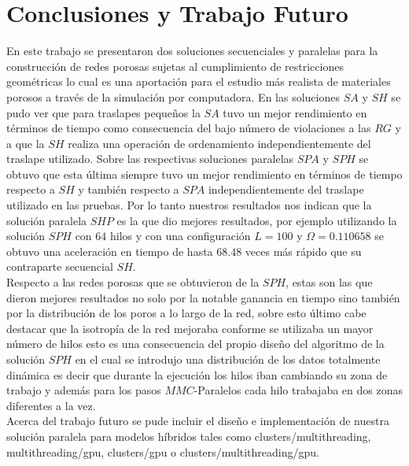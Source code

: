 \chapter{Conclusiones y Trabajo Futuro}
\label{champ:conclusions}
\bigskip
\barra
\bigskip

En este trabajo se presentaron dos soluciones secuenciales y paralelas para la construcción de redes porosas sujetas al cumplimiento de restricciones geométricas lo cual es una aportación para el estudio más realista de materiales porosos a través de la simulación por computadora. En las soluciones $SA$ y $SH$ se pudo ver que para traslapes pequeños la $SA$ tuvo un mejor rendimiento en términos de tiempo como consecuencia del bajo número de violaciones a las $RG$ y a que la $SH$ realiza una operación de ordenamiento independientemente del traslape utilizado. Sobre las respectivas soluciones paralelas $SPA$ y $SPH$ se obtuvo que esta última siempre tuvo un mejor rendimiento en términos de tiempo respecto a $SH$ y también respecto a $SPA$ independientemente del traslape utilizado en las pruebas.  Por lo tanto nuestros resultados nos indican que la solución paralela $SHP$ es la que dio mejores resultados, por ejemplo utilizando la solución $SPH$ con $64$ hilos y con una configuración $L=100$ y $\Omega=0.110658$ se obtuvo una aceleración en tiempo de hasta $68.48$ veces más rápido que su contraparte secuencial $SH$.\\

Respecto a las redes porosas que se obtuvieron de la $SPH$, estas son las que dieron mejores resultados no solo por la notable ganancia en tiempo sino también por la distribución de los poros a lo largo de la red, sobre esto último cabe destacar que la isotropía de la red mejoraba conforme se utilizaba un mayor número de hilos esto es una consecuencia del propio diseño del algoritmo de la solución $SPH$ en el cual se introdujo una distribución de los datos totalmente dinámica es decir que durante la ejecución los hilos iban cambiando su zona de trabajo y además para los pasos $MMC$-Paralelos cada hilo trabajaba en dos zonas diferentes a la vez.\\

Acerca del trabajo futuro se pude incluir el diseño e implementación de nuestra solución paralela para modelos híbridos tales como clusters/multithreading, multithreading/gpu, clusters/gpu o clusters/multithreading/gpu.




